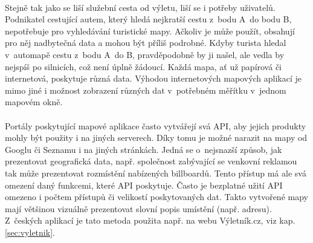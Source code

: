 \documentclass[11pt,a4paper,titlepage,oneside]{book}
\begin{document}
	\paragraph{} Stejně tak jako se liší služební cesta od výletu, liší se i potřeby uživatelů. Podnikatel cestující autem, který hledá nejkratší cestu z~bodu A~do bodu B, nepotřebuje pro vyhledávání turistické mapy. Ačkoliv je může použít, obsahují pro něj nadbytečná data a mohou být příliš podrobné. Kdyby turista hledal v~automapě cestu z~bodu A~do B, pravděpodobně by ji našel, ale vedla by nejspíš po silnicích, což není úplně žádoucí. Každá mapa, ať už papírová či internetová, poskytuje různá data. Výhodou internetových mapových aplikací je mimo jiné i možnost zobrazení různých dat v~potřebném měřítku v~jednom mapovém okně.







	\paragraph{} Portály poskytující mapové aplikace často vytvářejí svá \ac{API}, aby jejich produkty mohly být použity i na jiných serverech. Díky tomu je možné narazit na mapy od Googlu či Seznamu i na jiných stránkách. Jedná se o~nejsnazší způsob, jak prezentovat geografická data, např. společnost zabývající se venkovní reklamou tak může prezentovat rozmístění nabízených billboardů. Tento přístup má ale svá omezení daný funkcemi, které \ac{API} poskytuje. Často je bezplatné užití \ac{API} omezeno i počtem přístupů či velikostí poskytovaných dat. Takto vytvořené mapy mají většinou vizuálně prezentovat slovní popis umístění (např. adresu). Z~českých aplikací je tato metoda použita např. na webu Výletník.cz, viz kap. \ref{sec:vyletnik}.
\end{document}
